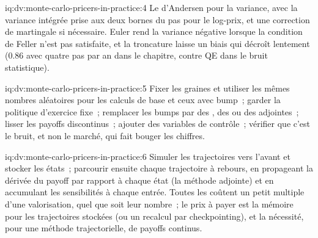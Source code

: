 \begin{solution}{iq:dv:monte-carlo-pricers-in-practice:4}
Le  d'Andersen pour la variance, avec la variance intégrée prise aux deux bornes du pas pour le log-prix, et une
correction de martingale si nécessaire. Euler rend la variance négative lorsque la condition de Feller n'est pas satisfaite, et la troncature laisse un biais qui décroît lentement (0.86 avec quatre
pas par an dans le chapitre, contre QE dans le bruit statistique).
\end{solution}

\begin{solution}{iq:dv:monte-carlo-pricers-in-practice:5}
Fixer les graines et utiliser les mêmes nombres aléatoires pour les calculs de base et ceux avec bump~; garder la politique d'exercice fixe~; remplacer les bumps par des , des  ou des  adjointes~; lisser les payoffs discontinus~; ajouter des variables de contrôle~; vérifier que c'est le bruit, et non le marché, qui fait bouger les chiffres.
\end{solution}

\begin{solution}{iq:dv:monte-carlo-pricers-in-practice:6}
Simuler les trajectoires vers l'avant et stocker les états~; parcourir ensuite chaque trajectoire à rebours, en propageant la dérivée du payoff par rapport à chaque état (la
méthode adjointe) et en accumulant les sensibilités à chaque entrée. Toutes les  coûtent un petit multiple d'une valorisation, quel que soit leur nombre~; le prix à payer est la mémoire pour
les trajectoires stockées (ou un recalcul par checkpointing), et la nécessité, pour une méthode trajectorielle, de payoffs continus.
\end{solution}
